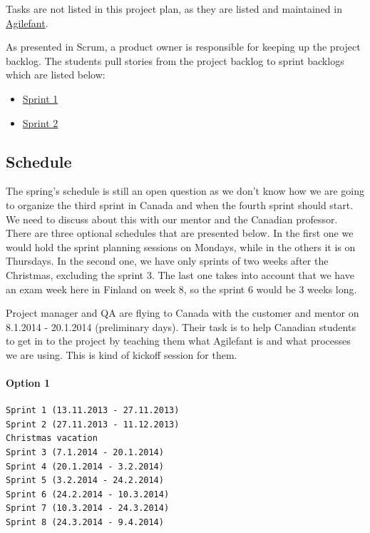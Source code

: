 Tasks are not listed in this project plan, as they are listed and maintained in 
\href{https://cloud.agilefant.com/dev/}{Agilefant}.

As presented in Scrum, a product owner is responsible for keeping up the
project backlog. The students pull stories from the project backlog to sprint
backlogs which are listed below:

\begin{itemize}
  \item
  \href{https://cloud.agilefant.com/dev/ROIteration.action?readonlyToken=656371244996018241588558287820343266020}{Sprint
  1}
  \item
  \href{https://cloud.agilefant.com/dev/ROIteration.action?readonlyToken=807072238002616723743205864538724805102}{Sprint
  2}
\end{itemize}

\subsection{Schedule}

The spring's schedule is still an open question as we don't know how we are
going to organize the third sprint in Canada and when the fourth sprint should
start. We need to discuss about this with our mentor and the Canadian professor.
There are three optional schedules that are presented below. In the first one we
would hold the sprint planning sessions on Mondays, while in the others it is on
Thursdays. In the second one, we have only sprints of two weeks after the
Christmas, excluding the sprint 3. The last one takes into account that we have
an exam week here in Finland on week 8, so the sprint 6 would be 3 weeks long.

Project manager and QA are flying to Canada with the customer and mentor on
8.1.2014 - 20.1.2014 (preliminary days). Their task is to help Canadian students
to get in to the project by teaching them what Agilefant is and what processes
we are using. This is kind of kickoff session for them.

\paragraph{Option 1}

\begin{verbatim}
Sprint 1 (13.11.2013 - 27.11.2013)
Sprint 2 (27.11.2013 - 11.12.2013)
Christmas vacation
Sprint 3 (7.1.2014 - 20.1.2014)
Sprint 4 (20.1.2014 - 3.2.2014)
Sprint 5 (3.2.2014 - 24.2.2014)
Sprint 6 (24.2.2014 - 10.3.2014)
Sprint 7 (10.3.2014 - 24.3.2014)
Sprint 8 (24.3.2014 - 9.4.2014) 
\end{verbatim}

